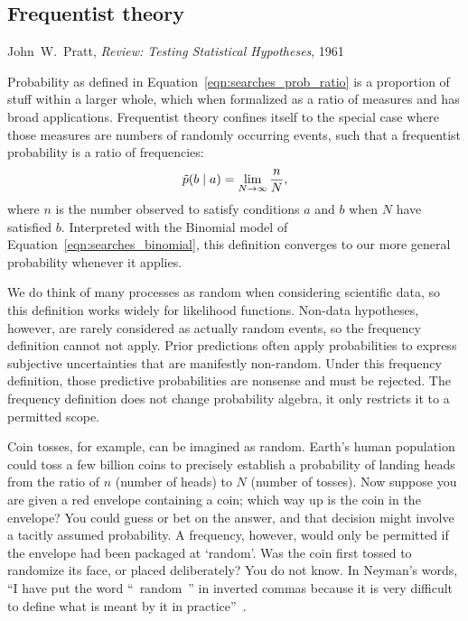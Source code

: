\begin{singlespacing}
\section{Frequentist theory}
\label{sec:searches_frequentist}
\begin{epigraphs}
%
{John~W.~Pratt,
\textit{Review: Testing Statistical Hypotheses},
1961~\cite{pratt1961testing}}
\end{epigraphs}
\end{singlespacing}

Probability as defined in Equation~\ref{eqn:searches_prob_ratio} is a
proportion of stuff within a larger whole, which when formalized as a ratio
of measures and has broad applications.
Frequentist theory confines itself to the special case where those measures
are numbers of randomly occurring events, such that a frequentist
probability is a ratio of frequencies:
\begin{equation}
\label{eqn:searches_prob_frequency_ratio}
\tilde{p}(b\mid a) = \lim_{N \to \infty}\frac{n}{N},
\end{equation}
where $n$ is the number observed to satisfy conditions $a$ and $b$ when
$N$ have satisfied $b$.
Interpreted with the Binomial model of
Equation~\ref{eqn:searches_binomial}, this definition converges to our more
general probability whenever it applies.

We do think of many processes as random when considering scientific data, so
this definition works widely for likelihood functions.
Non-data hypotheses, however, are rarely considered as actually random events,
so the frequency definition cannot not apply.
Prior predictions often apply probabilities to express subjective uncertainties
that are manifestly non-random.
Under this frequency definition, those predictive probabilities are nonsense
and must be rejected.
The frequency definition does not change probability algebra, it only restricts
it to a permitted scope.

Coin tosses, for example, can be imagined as random.
Earth's human population could toss a few billion coins to precisely
establish a probability of landing heads from the ratio of
$n$ (number of heads) to $N$ (number of tosses).
Now suppose you are given a red envelope containing a coin;
which way up is the coin in the envelope?
You could guess or bet on the answer, and that decision might involve a tacitly
assumed probability.
A frequency, however, would only be permitted if the envelope had been packaged
at `random'.
Was the coin first tossed to randomize its face, or placed deliberately?
You do not know.
In Neyman's words,
``I have put the word ``~random~'' in inverted commas because it is very
difficult to define what is meant by it in practice''~\cite{
Neyman1937Outline
}.

